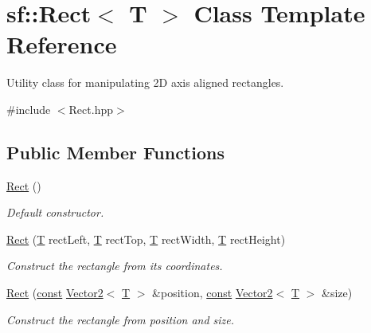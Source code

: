 \hypertarget{classsf_1_1_rect}{\section{sf\-:\-:Rect$<$ T $>$ Class Template Reference}
\label{classsf_1_1_rect}
}


Utility class for manipulating 2\-D axis aligned rectangles.  




{\ttfamily \#include $<$Rect.\-hpp$>$}

\subsection*{Public Member Functions}
\begin{DoxyCompactItemize}
\item 
\hyperlink{classsf_1_1_rect_a0f87ebaef9722a6222fd2e04ce8efb37}{Rect} ()
\begin{DoxyCompactList}\small\item\em Default constructor. \end{DoxyCompactList}\item 
\hyperlink{classsf_1_1_rect_a15cdbc5a1aed3a8fc7be1bd5004f19f9}{Rect} (\hyperlink{curses_8priv_8h_a5ef253115820acf7d27f3c5c3b02a0f0}{T} rect\-Left, \hyperlink{curses_8priv_8h_a5ef253115820acf7d27f3c5c3b02a0f0}{T} rect\-Top, \hyperlink{curses_8priv_8h_a5ef253115820acf7d27f3c5c3b02a0f0}{T} rect\-Width, \hyperlink{curses_8priv_8h_a5ef253115820acf7d27f3c5c3b02a0f0}{T} rect\-Height)
\begin{DoxyCompactList}\small\item\em Construct the rectangle from its coordinates. \end{DoxyCompactList}\item 
\hyperlink{classsf_1_1_rect_a27fdf85caa6d12caeeff78913cc59936}{Rect} (\hyperlink{term__entry_8h_a57bd63ce7f9a353488880e3de6692d5a}{const} \hyperlink{classsf_1_1_vector2}{Vector2}$<$ \hyperlink{curses_8priv_8h_a5ef253115820acf7d27f3c5c3b02a0f0}{T} $>$ \&position, \hyperlink{term__entry_8h_a57bd63ce7f9a353488880e3de6692d5a}{const} \hyperlink{classsf_1_1_vector2}{Vector2}$<$ \hyperlink{curses_8priv_8h_a5ef253115820acf7d27f3c5c3b02a0f0}{T} $>$ \&size)
\begin{DoxyCompactList}\small\item\em Construct the rectangle from position and size. \end{DoxyCompactList}\item 

\end{DoxyCompactItemize}
